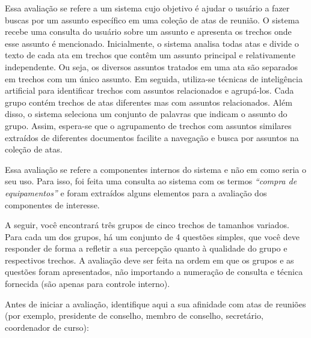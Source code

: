 
Essa avaliação se refere a um sistema cujo objetivo é ajudar o usuário a fazer buscas por um assunto específico em uma coleção de atas de reunião. O sistema recebe uma consulta do usuário sobre um assunto e apresenta os trechos onde esse assunto é mencionado. Inicialmente, o sistema analisa todas atas e divide o texto de cada ata em trechos que contêm um assunto principal e relativamente independente. Ou seja, os diversos assuntos tratados em uma ata são separados em trechos com um único assunto. Em seguida, utiliza-se técnicas de inteligência artificial para identificar trechos com assuntos relacionados e agrupá-los. Cada grupo contém trechos de atas diferentes mas com assuntos relacionados. Além disso, o sistema seleciona um conjunto de palavras que indicam o assunto do grupo. Assim, espera-se que o agrupamento de trechos com assuntos similares extraídos de diferentes documentos facilite a navegação e busca por assuntos na coleção de atas.

Essa avaliação se refere a componentes internos do sistema e não em como seria o seu uso. Para isso, foi feita uma consulta ao sistema com os termos \textit{``compra de equipamentos''} e foram extraídos 
%
%
alguns elementos 
para a avaliação dos componentes de interesse.

A seguir, você encontrará três grupos de cinco trechos de tamanhos variados. Para cada um dos grupos, há um conjunto de 4 questões simples, que você deve responder de forma a refletir a sua percepção quanto à qualidade do grupo e respectivos trechos. A avaliação deve ser feita na ordem em que os grupos e as questões foram apresentados, não importando a numeração de consulta e técnica fornecida (são apenas para controle interno).

\vspace{2em}
Antes de iniciar a avaliação, identifique aqui a sua afinidade com atas de reuniões (por exemplo, presidente de conselho, membro de conselho, secretário, coordenador de curso):









